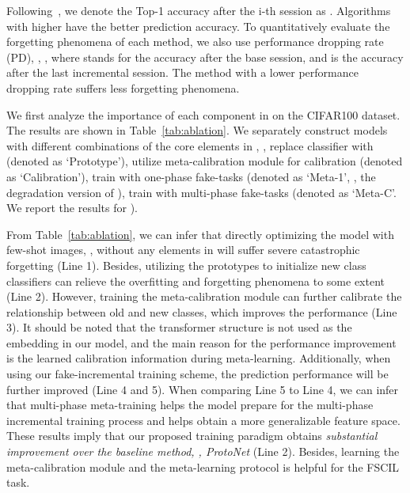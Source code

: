  


  Following~\cite{tao2020few,zhang2021few}, we denote the Top-1 accuracy after the i-th session as . Algorithms with higher  have the better prediction accuracy.
To quantitatively evaluate the forgetting phenomena of each method, we also use performance dropping rate (PD), \ie, , where  stands for the accuracy after the base session, and  is the accuracy after the last incremental session. The method with a lower performance dropping rate suffers less forgetting phenomena.










We first analyze the importance of each component in \name on the CIFAR100 dataset. The results are shown in Table~\ref{tab:ablation}. We separately construct models with different combinations of the core elements in \mame, \eg, replace classifier with  (denoted as `Prototype'), utilize meta-calibration module  for calibration (denoted as `Calibration'), train with one-phase fake-tasks (denoted as `Meta-1', \ie, the degradation version of \mame), train with multi-phase fake-tasks (denoted as `Meta-C'. We report the results for ).



From Table~\ref{tab:ablation}, we can infer that directly optimizing the model with few-shot images, \ie, without any elements in \name will suffer severe catastrophic forgetting (Line 1). Besides, utilizing the prototypes to initialize new class classifiers can relieve the overfitting and forgetting phenomena to some extent (Line 2). However, training the meta-calibration module can further calibrate the relationship between old and new classes, which improves the performance (Line 3). It should be noted that the transformer structure is not used as the embedding in our model, and the main reason for the performance improvement is the learned calibration information during meta-learning.
 Additionally, when using our fake-incremental training scheme, the prediction performance will be further improved (Line 4 and 5). When comparing Line 5 to Line 4, we can infer that multi-phase meta-training helps the model prepare for the multi-phase incremental training process and helps obtain a more generalizable feature space.  
 These results imply that our proposed training paradigm obtains \emph{substantial improvement over the baseline method, \ie, ProtoNet} (Line 2). Besides, learning the meta-calibration module and the meta-learning protocol is helpful for the FSCIL task. 





